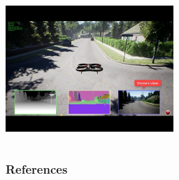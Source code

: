 \documentclass[aspectratio=169]{rubeamer}
\begin{document}
\begin{frame}
\begin{columns}
      \includegraphics[width=0.5\textwidth]{airsim}
  \end{columns}
\end{frame}

\begin{frame}[allowframebreaks]
  \frametitle{References}
  \printbibliography{}
\end{frame}
\end{document}
